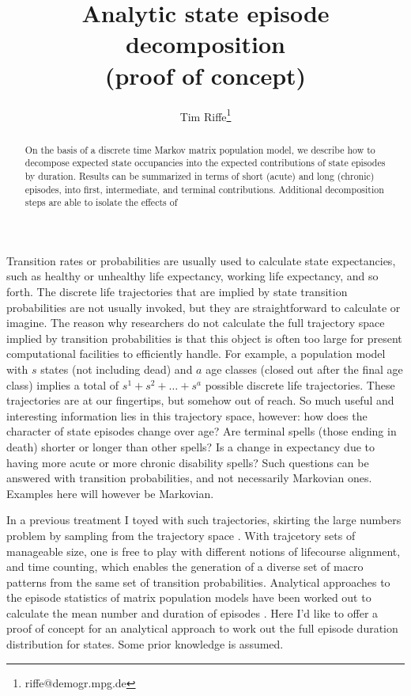 \documentclass{article}
\begin{document}
\title{Analytic state episode decomposition \\ (proof of concept)}
\author[1]{Tim Riffe\thanks{riffe@demogr.mpg.de}}
\begin{abstract}
On the basis of a discrete time Markov matrix population model, we describe
how to decompose expected state occupancies into the expected contributions of state
episodes by duration. Results can be summarized in terms of short (acute) and
long (chronic) episodes, into first, intermediate, and terminal contributions.
Additional decomposition steps are able to isolate the effects of 
\end{abstract}

Transition rates or probabilities are usually used to calculate state
expectancies, such as healthy or unhealthy life expectancy, working life
expectancy, and so forth. The discrete life trajectories that are
implied by state transition probabilities are not usually invoked, but they are
straightforward to calculate or imagine. The reason why researchers do not
calculate the full trajectory space implied by transition probabilities is
that this object is often too large for present computational facilities to
efficiently handle. For example, a population model with $s$ states (not
including dead) and $a$ age classes (closed out after the final age class)
implies a total of $s^1 + s^2 + \ldots + s^a$ possible discrete
life trajectories. These trajectories are at our fingertips, but somehow out of
reach. So much useful and interesting information lies in this trajectory space,
however: how does the character of state episodes change over age? Are
terminal spells (those ending in death) shorter or longer than other spells? Is
a change in expectancy due to having more acute or more chronic disability
spells? Such questions can be answered with transition probabilities, and not
necessarily Markovian ones. Examples here will however be Markovian.

In a previous treatment I toyed with such trajectories,
skirting the large numbers problem by sampling from the trajectory space
\citep{riffespells2018}. With trajcetory sets of manageable size, one is free to
play with different notions of lifecourse alignment, and time counting, which enables
the generation of a diverse set of macro patterns from
the same set of transition probabilities. Analytical approaches to the episode statistics of matrix population models have been worked out to calculate the mean number and duration of episodes \citep{dudel2018b}. Here I'd like to offer a proof of concept for an analytical approach to work out the full episode duration distribution for states. Some prior knowledge is assumed.
\end{document}
